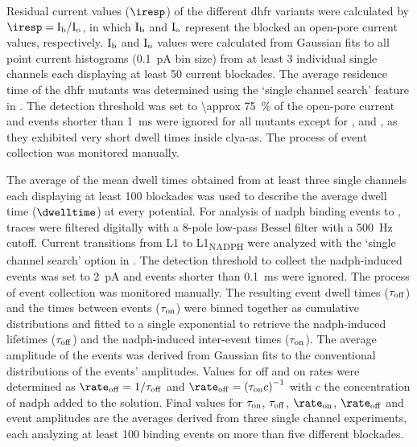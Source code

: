 Residual current values ($\iresp$) of the different \gls{dhfr} variants were calculated by $\iresp =
\rm{I}_b/\rm{I}_o$, in which $\rm{I}_b$ and $\rm{I}_o$ represent the blocked an open-pore current values,
respectively. $\rm{I}_b$ and $\rm{I}_o$ values were calculated from Gaussian fits to all point current
histograms (\SI{0.1}{\pA} bin size) from at least 3 individual single channels each displaying at least 50
current blockades. The average residence time of the \gls{dhfr} mutants was determined using the `single
channel search' feature in . The detection threshold was set to \SI{\approx 75}{\percent} of
the open-pore current and events shorter than \SI{1}{\ms} were ignored for all mutants except for ,
 and , as they exhibited very short dwell times inside \gls{clya-as}. The process of
event collection was monitored manually.

The average of the mean dwell times obtained from at least three single channels each displaying at least 100
blockades was used to describe the average dwell time ($\dwelltime$) at every potential. For analysis of
\gls{nadph} binding events to , traces were filtered digitally with a 8-pole low-pass Bessel
filter with a \SI{500}{\hertz} cutoff. Current transitions from L1 to L1\textsubscript{NADPH} were analyzed
with the `single channel search' option in . The detection threshold to collect the
\gls{nadph}-induced events was set to \SI{2}{\pA} and events shorter than \SI{0.1}{\ms} were ignored. The
process of event collection was monitored manually. The resulting event dwell times ($\tau_{\rm{off}}$) and
the times between events ($\tau_{\rm{on}}$) were binned together as cumulative distributions and fitted to a
single exponential to retrieve the \gls{nadph}-induced lifetimes ($\tau_{\rm{off}}$) and the
\gls{nadph}-induced inter-event times ($\tau_{\rm{on}}$). The average amplitude of the events was derived from
Gaussian fits to the conventional distributions of the events' amplitudes. Values for off and on rates were
determined as $\rate_{\rm{off}} = 1/\tau_{\rm{off}}$ and $\rate_{\rm{off}} = \left(\tau_{\rm{on}} c
\right)^{-1}$ with $c$ the concentration of \gls{nadph} added to the \transi{} solution. Final values for
$\tau_{\rm{on}}$, $\tau_{\rm{off}}$, $\rate_{\rm{on}}$, $\rate_{\rm{off}}$ and event amplitudes are the
averages derived from three single channel experiments, each analyzing at least 100 binding events on more
than five different  blockades.



\cleardoublepage

